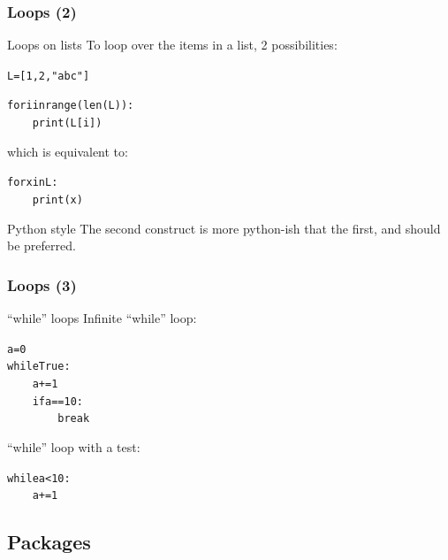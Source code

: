 \documentclass[xcolor=pdftex,dvipsnames,table,mathserif]{beamer}
\begin{document}
\begin{frame}
  \frametitle{Loops (2)}

  \begin{block}{Loops on lists}
    To loop over the items in a list, 2 possibilities:
    \begin{alltt}
      L = [ 1 , 2 , "abc" ]

      for i in range( len(L) ):\\
      ~~~~    print(L[i])
    \end{alltt}
    which is equivalent to:
    \begin{alltt}
      for x in L:\\
      ~~~~    print(x)
    \end{alltt}
  \end{block}

\begin{alertblock}{Python style}
  The second construct is more python-ish that the first, and should be preferred.
\end{alertblock}

\end{frame}

\begin{frame}
  \frametitle{Loops (3)}

  \begin{block}{``while'' loops}
    Infinite ``while'' loop:
    \begin{alltt}
      a = 0\\
      while True:\\
      ~~~~    a += 1\\
      ~~~~    if a == 10:\\
      ~~~~ ~~~~        break
    \end{alltt}
    ``while'' loop with a test:
    \begin{alltt}
      while a < 10:\\
      ~~~~    a+=1
    \end{alltt}
  \end{block}
\end{frame}


\subsection{Packages}
\end{document}
